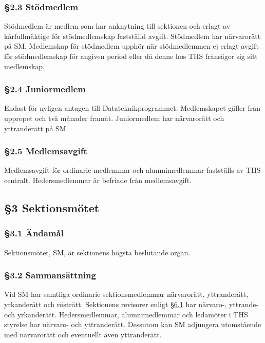 \subsubsection{§2.3 Stödmedlem}

Stödmedlem är medlem som har anknytning till sektionen och erlagt av kårfullmäktige för stödmedlemskap fastställd avgift. Stödmedlem har närvarorätt på SM. Medlemskap för stödmedlem upphör när stödmedlemmen ej erlagt avgift för stödmedlemskap för angiven period eller då denne hos THS frånsäger sig sitt medlemskap.

\subsubsection{§2.4 Juniormedlem}

Endast för nyligen antagen till Datateknikprogrammet. Medlemskapet gäller från uppropet och två månader framåt. Juniormedlem har närvarorätt och yttranderätt på SM.

\subsubsection{§2.5 Medlemsavgift}

Medlemsavgift för ordinarie medlemmar och alumnimedlemmar fastställs av THS centralt. Hedersmedlemmar är befriade från medlemsavgift.

\subsection{§3 Sektionsmötet}

\subsubsection{§3.1 Ändamål}

Sektionsmötet, SM, är sektionens högsta beslutande organ.

\subsubsection{§3.2 Sammansättning}

Vid SM har samtliga ordinarie sektionsmedlemmar närvarorätt, yttranderätt, yrkanderätt och rösträtt. Sektionens revisorer enligt \href{#revisorer}{§6.1} har närvaro-, yttrande- och yrkanderätt. Hedersmedlemmar, alumnimedlemmar och ledamöter i THS styrelse har närvaro- och yttranderätt. Dessutom kan SM adjungera utomstående med närvarorätt och eventuellt även yttranderätt.

